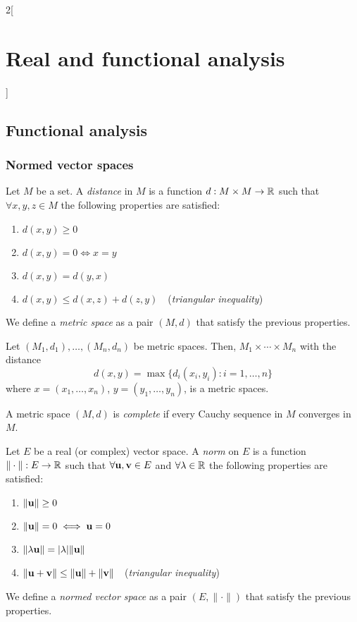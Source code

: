 \documentclass[../../../main_math.tex]{subfiles}
\begin{document}
\begin{multicols}{2}[\section{Real and functional analysis}]
  \subsection{Functional analysis}
  \subsubsection{Normed vector spaces}
  \begin{definition}
    Let $M$ be a set. A \emph{distance} in $M$ is a function $d:M\times M\rightarrow\mathbb{R} $ such that $\forall x,y,z\in M$ the following properties are satisfied:
    \begin{enumerate}
      \item $d(x,y)\geq 0$
      \item $d(x,y)=0\iff x=y$
      \item $d(x,y)=d(y,x)$
      \item $d(x,y)\leq d(x,z)+d(z,y)\quad$(\emph{triangular inequality})
    \end{enumerate}
    We define a \emph{metric space} as a pair $(M,d)$ that satisfy the previous properties.
  \end{definition}
  \begin{proposition}
    Let $(M_1,d_1),\ldots,(M_n,d_n)$ be metric spaces. Then, $M_1\times\cdots\times M_n$ with the distance $$d(x,y)=\max\{d_i(x_i,y_i):i=1,\ldots,n\}$$ where $x=(x_1,\ldots,x_n)$, $y=(y_1,\ldots,y_n)$, is a metric spaces.
  \end{proposition}
  \begin{definition}
    A metric space $(M,d)$ is \emph{complete} if every Cauchy sequence in $M$ converges in $M$.
  \end{definition}
  \begin{definition}
    Let $E$ be a real (or complex) vector space. A \emph{norm} on $E$ is a function $\|\cdot\|:E\rightarrow\mathbb{R} $ such that $\forall \boldsymbol{\mathrm{u}},\boldsymbol{\mathrm{v}}\in E$ and $\forall\lambda\in\mathbb{R} $ the following properties are satisfied:
    \begin{enumerate}
      \item $\|\boldsymbol{\mathrm{u}}\|\geq 0$
      \item $\|\boldsymbol{\mathrm{u}}\|=0\iff \boldsymbol{\mathrm{u}}=0$
      \item $\|\lambda \boldsymbol{\mathrm{u}}\|=|\lambda|\|\boldsymbol{\mathrm{u}}\|$
      \item $\|\boldsymbol{\mathrm{u}}+\boldsymbol{\mathrm{v}}\|\leq \|\boldsymbol{\mathrm{u}}\|+\|\boldsymbol{\mathrm{v}}\|\quad$(\emph{triangular inequality})
    \end{enumerate}
    We define a \emph{normed vector space} as a pair $(E,\|\cdot\|)$ that satisfy the previous properties.

\end{definition}
\end{multicols}
\end{document}
